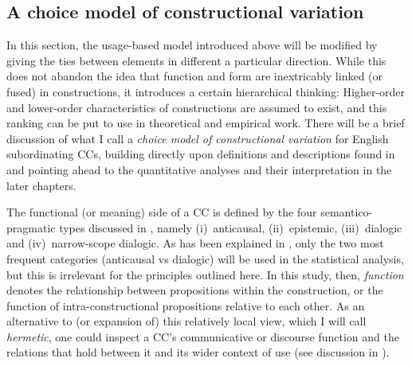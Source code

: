 \subsection{\label{bkm:Ref35374759}A choice model of constructional variation}\label{sec:4.1.3}

In this section, the usage-based model introduced above will be modified by giving the ties between elements in different  a particular direction. While this does not abandon the idea that function and form are inextricably linked (or fused) in constructions, it introduces a certain hierarchical thinking: Higher-order and lower-order characteristics of constructions are assumed to exist, and this ranking can be put to use in theoretical and empirical work. There will be a brief discussion of what I call a \textit{choice model of constructional variation} for English subordinating CCs, building directly upon definitions and descriptions found in  and pointing ahead to the quantitative analyses and their interpretation in the later chapters.

  The functional (or meaning) side of a CC is defined by the four semantico-pragmatic types discussed in , namely
(i)~anticausal,
(ii)~epistemic,
(iii)~dialogic and
(iv)~narrow-scope dialogic. As has been explained in , only the two most frequent categories (anticausal vs dialogic) will be used in the statistical analysis, but this is irrelevant for the principles outlined here. In this study, then, \textit{function} denotes the relationship between propositions within the construction, or the function of intra-constructional propositions relative to each other. As an alternative to (or expansion of) this relatively local view, which I will call \textit{hermetic}, one could inspect a CC’s communicative or discourse function and the relations that hold between it and its wider context of use (see discussion in ).

